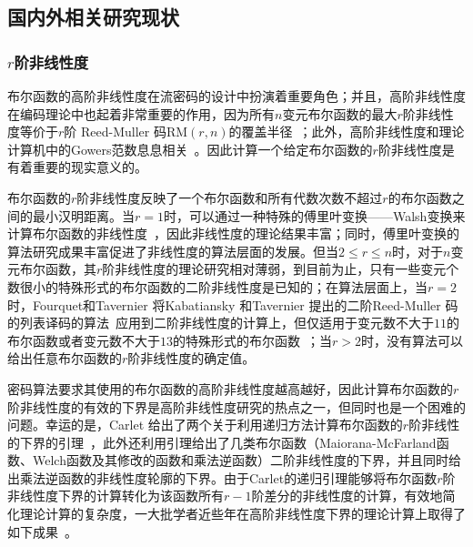 \documentclass[a4paper,zihao=-4,AutoFakeBold]{ctexart}
\begin{document}
\subsection{国内外相关研究现状}
\subsubsection{$r$阶非线性度}
布尔函数的高阶非线性度在流密码的设计中扮演着重要角色；并且，高阶非线性度在编码理论中也起着非常重要的作用，因为所有$n$变元布尔函数的最大$r$阶非线性度等价于$r$阶 Reed-Muller 码$\mathrm{RM}(r, n)$的覆盖半径~\cite{CHLL97}；此外，高阶非线性度和理论计算机中的Gowers范数息息相关~\cite{BKSSZ}。因此计算一个给定布尔函数的$r$阶非线性度是有着重要的现实意义的。

布尔函数的$r$阶非线性度反映了一个布尔函数和所有代数次数不超过$r$的布尔函数之间的最小汉明距离。当$r=1$时，可以通过一种特殊的傅里叶变换——Walsh变换来计算布尔函数的非线性度~\cite{CarletBook2020}，因此非线性度的理论结果丰富；同时，傅里叶变换的算法研究成果丰富促进了非线性度的算法层面的发展。但当$2\le r \le n$时，对于$n$变元布尔函数，其$r$阶非线性度的理论研究相对薄弱，到目前为止，只有一些变元个数很小的特殊形式的布尔函数的二阶非线性度是已知的；在算法层面上，当$r=2$时，Fourquet和Tavernier 将Kabatiansky 和Tavernier 提出的二阶Reed-Muller 码的列表译码的算法~\cite{Kabatiansky-Tavernier07}应用到二阶非线性度的计算上，但仅适用于变元数不大于$11$的布尔函数或者变元数不大于$13$的特殊形式的布尔函数~\cite{Fourquet-Tavernier07}；当$r>2$时，没有算法可以给出任意布尔函数的$r$阶非线性度的确定值。

密码算法要求其使用的布尔函数的高阶非线性度越高越好，因此计算布尔函数的$r$阶非线性度的有效的下界是高阶非线性度研究的热点之一，但同时也是一个困难的问题。幸运的是，Carlet 给出了两个关于利用递归方法计算布尔函数的$r$阶非线性的下界的引理~\cite{CC08IT}，此外还利用引理给出了几类布尔函数（Maiorana-McFarland函数、Welch函数及其修改的函数和乘法逆函数）二阶非线性度的下界，并且同时给出乘法逆函数的非线性度轮廓的下界。由于Carlet的递归引理能够将布尔函数$r$阶非线性度下界的计算转化为该函数所有$r-1$阶差分的非线性度的计算，有效地简化理论计算的复杂度，一大批学者近些年在高阶非线性度下界的理论计算上取得了如下成果~\cite{CC11sec,GSTnl10,SecnlGMM18,GS2010,Liu2023NL_2,MesnagerNL2017IJCM,Singh2014thirdnl,SWnl2009,SW2011,TCTIS13,SecNLCCDS2019,SecNLDM2020}。
\end{document}
